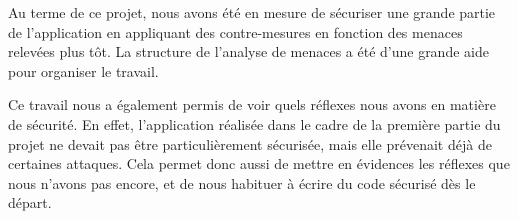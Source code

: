 \documentclass{article}
\begin{document}
Au terme de ce projet, nous avons été en mesure de sécuriser une grande
partie de l'application en appliquant des contre-mesures en fonction des
menaces relevées plus tôt. La structure de l'analyse de menaces a été
d'une grande aide pour organiser le travail.

Ce travail nous a également permis de voir quels réflexes nous avons en
matière de sécurité. En effet, l'application réalisée dans le cadre de
la première partie du projet ne devait pas être particulièrement
sécurisée, mais elle prévenait déjà de certaines attaques. Cela permet
donc aussi de mettre en évidences les réflexes que nous n'avons pas
encore, et de nous habituer à écrire du code sécurisé dès le départ.
\end{document}
